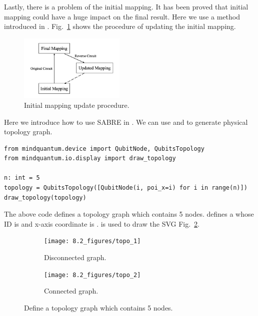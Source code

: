 Lastly, there is a problem of the initial mapping. It has been proved that initial mapping could have a huge impact on the final result. Here we use a method introduced in \cite{li2019tackling}.
Fig.~\ref{fig:qubit-mapping-initial-mapping}
shows the procedure of updating the initial mapping.

\begin{figure}
	\centering
	\includegraphics[width=0.45\textwidth]{8.2_figures/initial_mapping.png}
	\caption{Initial mapping update procedure.}
	\label{fig:qubit-mapping-initial-mapping}
\end{figure}

Here we introduce how to use SABRE in \MindQuantum. We can use  and  to generate physical topology graph.

\begin{lstlisting}
from mindquantum.device import QubitNode, QubitsTopology
from mindquantum.io.display import draw_topology

n: int = 5
topology = QubitsTopology([QubitNode(i, poi_x=i) for i in range(n)])
draw_topology(topology)
\end{lstlisting}

The above code defines a topology graph which contains 5 nodes.  defines a  whose ID is  and x-axis coordinate is .  is used to draw the SVG Fig.~\ref{fig:qubit-mapping-topo1}.

\begin{figure}
	\centering
	\begin{subfigure}{0.2\textwidth}
		\centering
		\texttt{[image: 8.2\_figures/topo\_1]}
		\caption{Disconnected graph.}
		\label{fig:qubit-mapping-topo1}
	\end{subfigure}
	\begin{subfigure}{0.2\textwidth}
		\centering
		\texttt{[image: 8.2\_figures/topo\_2]}
		\caption{Connected graph.}
		\label{fig:qubit-mapping-topo2}
	\end{subfigure}
	\caption{Define a topology graph which contains 5 nodes.}
\end{figure}

